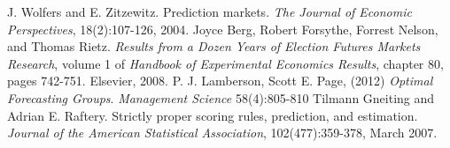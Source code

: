 \documentclass[twoside,twocolumn]{article}
\begin{document}

\begin{thebibliography}{99} %

J. Wolfers and E. Zitzewitz. Prediction markets. \textit{The Journal of Economic Perspectives},
18(2):107-126, 2004.
 Joyce Berg, Robert Forsythe, Forrest Nelson, and Thomas Rietz. \textit{Results from
a Dozen Years of Election Futures Markets Research}, volume 1 of \textit{Handbook of
Experimental Economics Results}, chapter 80, pages 742-751. Elsevier, 2008.
P. J. Lamberson, Scott E. Page, (2012) \textit{Optimal Forecasting Groups}. \textit{Management Science} 58(4):805-810
Tilmann Gneiting and Adrian E. Raftery. Strictly proper scoring rules, prediction,
and estimation. \textit{Journal of the American Statistical Association}, 102(477):359-378,
March 2007.

 
\end{thebibliography}

\end{document}
